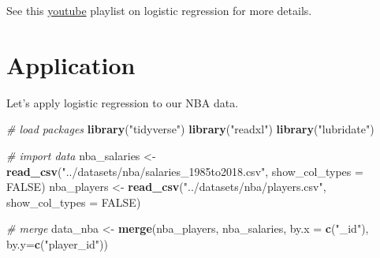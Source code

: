 \documentclass[
]{book}
\newenvironment{Shaded}{\begin{snugshade}}{\end{snugshade}}
\newcommand{\AttributeTok}[1]{\textcolor[rgb]{0.13,0.29,0.53}{#1}}
\newcommand{\CommentTok}[1]{\textcolor[rgb]{0.56,0.35,0.01}{\textit{#1}}}
\newcommand{\ConstantTok}[1]{\textcolor[rgb]{0.56,0.35,0.01}{#1}}
\newcommand{\FunctionTok}[1]{\textcolor[rgb]{0.13,0.29,0.53}{\textbf{#1}}}
\newcommand{\NormalTok}[1]{#1}
\newcommand{\OtherTok}[1]{\textcolor[rgb]{0.56,0.35,0.01}{#1}}
\newcommand{\StringTok}[1]{\textcolor[rgb]{0.31,0.60,0.02}{#1}}
\begin{document}
See this \href{https://www.youtube.com/watch?v=yIYKR4sgzI8\&list=PLblh5JKOoLUKxzEP5HA2d-Li7IJkHfXSe\&ab_channel=StatQuestwithJoshStarmer}{youtube} playlist on logistic regression for more details.

\hypertarget{application}{%
\section{Application}\label{application}}

Let's apply logistic regression to our NBA data.

\begin{Shaded}
\begin{Highlighting}[]
\CommentTok{\# load packages}
\FunctionTok{library}\NormalTok{(}\StringTok{"tidyverse"}\NormalTok{)}
\FunctionTok{library}\NormalTok{(}\StringTok{"readxl"}\NormalTok{)}
\FunctionTok{library}\NormalTok{(}\StringTok{"lubridate"}\NormalTok{)}

\CommentTok{\# import data }
\NormalTok{nba\_salaries }\OtherTok{\textless{}{-}} \FunctionTok{read\_csv}\NormalTok{(}\StringTok{"../datasets/nba/salaries\_1985to2018.csv"}\NormalTok{, }\AttributeTok{show\_col\_types =} \ConstantTok{FALSE}\NormalTok{)}
\NormalTok{nba\_players }\OtherTok{\textless{}{-}} \FunctionTok{read\_csv}\NormalTok{(}\StringTok{"../datasets/nba/players.csv"}\NormalTok{, }\AttributeTok{show\_col\_types =} \ConstantTok{FALSE}\NormalTok{)}

\CommentTok{\# merge}
\NormalTok{data\_nba }\OtherTok{\textless{}{-}} \FunctionTok{merge}\NormalTok{(nba\_players, nba\_salaries, }\AttributeTok{by.x =} \FunctionTok{c}\NormalTok{(}\StringTok{"\_id"}\NormalTok{), }\AttributeTok{by.y=}\FunctionTok{c}\NormalTok{(}\StringTok{"player\_id"}\NormalTok{))}


\end{Highlighting}
\end{Shaded}
\end{document}
